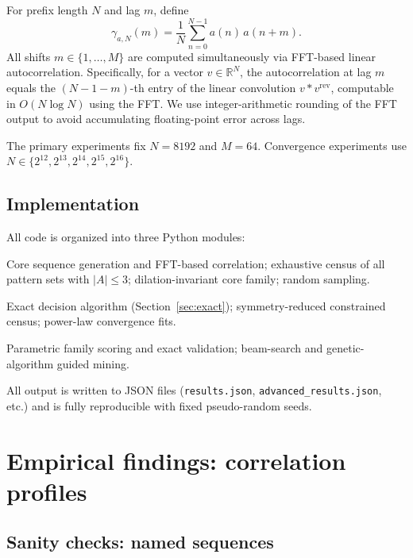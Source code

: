 \documentclass[11pt]{article}
\theoremstyle{definition}
\newcommand{\R}{\mathbb{R}}
\begin{document}
For prefix length $N$ and lag $m$, define
\[
    \gamma_{a,N}(m)
    = \frac{1}{N} \sum_{n=0}^{N-1} a(n)\,a(n+m).
\]
All shifts $m \in \{1, \ldots, M\}$ are computed simultaneously via
FFT-based linear autocorrelation. Specifically, for a vector
$v \in \R^N$, the autocorrelation at lag $m$ equals the $(N-1-m)$-th
entry of the linear convolution $v * v^{\mathrm{rev}}$, computable in
$O(N \log N)$ using the FFT. We use integer-arithmetic rounding of the
FFT output to avoid accumulating floating-point error across lags.

The primary experiments fix $N = 8192$ and $M = 64$. Convergence
experiments use $N \in \{2^{12}, 2^{13}, 2^{14}, 2^{15}, 2^{16}\}$.

\subsection{Implementation}

All code is organized into three Python modules:
\begin{description}[leftmargin=\parindent,labelindent=\parindent]
  \item[\texttt{experiments.py}]
    Core sequence generation and FFT-based correlation;
    exhaustive census of all pattern sets with $|A| \leq 3$;
    dilation-invariant core family; random sampling.

  \item[\texttt{advanced\_experiments.py}]
    Exact decision algorithm (Section~\ref{sec:exact});
    symmetry-reduced constrained census;
    power-law convergence fits.

  \item[\texttt{parametric\_family\_search.py} / \texttt{guided\_template\_search.py}]
    Parametric family scoring and exact validation;
    beam-search and genetic-algorithm guided mining.
\end{description}
All output is written to JSON files (\texttt{results.json},
\texttt{advanced\_results.json}, etc.) and is fully reproducible
with fixed pseudo-random seeds.

\section{Empirical findings: correlation profiles}
\label{sec:empirical}

\subsection{Sanity checks: named sequences}
\end{document}
